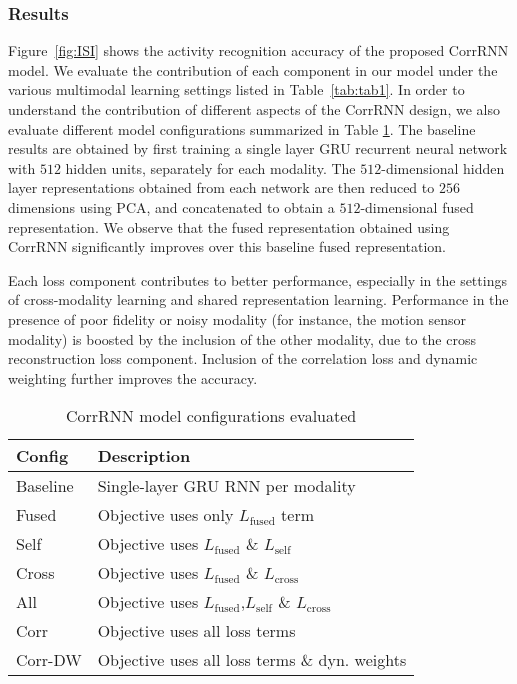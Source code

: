 \documentclass[10pt,twocolumn,letterpaper]{article}
\begin{document}
\subsubsection{Results}
Figure~\ref{fig:ISI} shows the activity recognition accuracy of the proposed CorrRNN model.
We evaluate the contribution of each component in our model under the various multimodal learning settings listed in Table~\ref{tab:tab1}. In order to understand the contribution of different aspects of the CorrRNN design, we also evaluate different model configurations summarized in Table \ref{tab:config}.
The baseline results are obtained by first training a single layer GRU recurrent neural network with $512$ hidden units, separately for each modality. The $512$-dimensional hidden layer representations obtained from each network are then reduced to $256$ dimensions using PCA, and concatenated to obtain a $512$-dimensional fused representation. We observe that the fused representation obtained using CorrRNN significantly improves over this baseline fused representation.  

Each loss component contributes to better performance, especially in the settings of cross-modality learning and shared representation learning. Performance in the presence of poor fidelity or noisy modality (for instance, the motion sensor modality) is boosted by the inclusion of the other modality, due to the cross reconstruction loss component. Inclusion of the correlation loss and dynamic weighting further improves the accuracy. 

\begin{table}[t!]
\begin{center}
\begin{tabular}{ | l | l |}
\hline
    Config & Description  \\
    \hline
    Baseline & Single-layer GRU RNN per modality \\
    \hline
    Fused & Objective uses only  $L_{\text{fused}}$ term\\
    \hline 
        Self & Objective uses  $L_{\text{fused}}$ \& $L_{\text{self}}$ \\
    \hline 
        Cross & Objective uses   $L_{\text{fused}}$ \& $L_{\text{cross}}$ \\
    \hline 
        All & Objective uses  $L_{\text{fused}}$,$L_{\text{self}}$ \& $L_{\text{cross}}$ \\
    \hline 
        Corr & Objective uses all loss terms \\
    \hline 
        Corr-DW &  Objective uses all loss terms \& dyn. weights \\
    \hline 
\end{tabular}
\end{center}
\caption{CorrRNN model configurations evaluated}
\label{tab:config}
\end{table}
\end{document}
